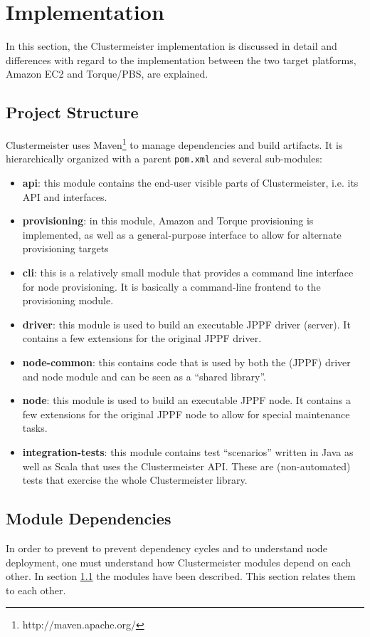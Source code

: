 \documentclass[12pt]{article}
\begin{document}
\section{Implementation}
\label{implementation}

In this section, the Clustermeister implementation is discussed in detail and differences with regard to the implementation between the two target platforms, Amazon EC2 and Torque/PBS, are explained.

\subsection{Project Structure}
\label{structure}

Clustermeister uses Maven\footnote{http://maven.apache.org/} to manage dependencies and build artifacts. It is hierarchically organized with a parent \texttt{pom.xml} and several sub-modules:

\begin{itemize}
 \item \textbf{api}: this module contains the end-user visible parts of Clustermeister, i.e. its API and interfaces.
 \item \textbf{provisioning}: in this module, Amazon and Torque provisioning is implemented, as well as a general-purpose interface to allow for alternate provisioning targets
 \item \textbf{cli}: this is a relatively small module that provides a command line interface for node provisioning. It is basically a command-line frontend to the provisioning module.
 \item \textbf{driver}: this module is used to build an executable JPPF driver (server). It contains a few extensions for the original JPPF driver.
 \item \textbf{node-common}: this contains code that is used by both the (JPPF) driver and node module and can be seen as a ``shared library''.
 \item \textbf{node}: this module is used to build an executable JPPF node. It contains a few extensions for the original JPPF node to allow for special maintenance tasks.
 \item \textbf{integration-tests}: this module contains test ``scenarios'' written in Java as well as Scala that uses the Clustermeister API. These are (non-automated) tests that exercise the whole Clustermeister library.
\end{itemize}

\subsection{Module Dependencies}
In order to prevent to prevent dependency cycles and to understand node deployment, one must understand how Clustermeister modules depend on each other. In section \ref{structure} the modules have been described. This section relates them to each other.
\end{document}
